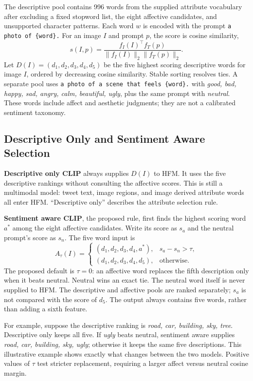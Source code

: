 \documentclass[conference]{IEEEtran}
\begin{document}
The descriptive pool contains 996 words from the supplied attribute vocabulary after excluding a fixed stopword list, the eight affective candidates, and unsupported character patterns. Each word $w$ is encoded with the prompt \texttt{a photo of \{word\}.} For an image $I$ and prompt $p$, the score is cosine similarity,
\begin{equation}
s(I,p)=\frac{f_I(I)^\top f_T(p)}{\lVert f_I(I)\rVert_2\lVert f_T(p)\rVert_2}.
\end{equation}
Let $D(I)=(d_1,d_2,d_3,d_4,d_5)$ be the five highest scoring descriptive words for image $I$, ordered by decreasing cosine similarity. Stable sorting resolves ties. A separate pool uses \texttt{a photo of a scene that feels \{word\}.} with \emph{good, bad, happy, sad, angry, calm, beautiful, ugly}, plus the same prompt with \emph{neutral}. These words include affect and aesthetic judgments; they are not a calibrated sentiment taxonomy.

\subsection{Descriptive Only and Sentiment Aware Selection}
\textbf{Descriptive only CLIP} always supplies $D(I)$ to HFM. It uses the five descriptive rankings without consulting the affective scores. This is still a multimodal model: tweet text, image regions, and image derived attribute words all enter HFM. ``Descriptive only'' describes the attribute selection rule.

\textbf{Sentiment aware CLIP}, the proposed rule, first finds the highest scoring word $a^*$ among the eight affective candidates. Write its score as $s_a$ and the neutral prompt's score as $s_n$. The five word input is
\begin{equation}
A_\tau(I)=
\begin{cases}
(d_1,d_2,d_3,d_4,a^*), & s_a-s_n>\tau,\\
(d_1,d_2,d_3,d_4,d_5), & \text{otherwise}.
\end{cases}
\end{equation}
The proposed default is $\tau=0$: an affective word replaces the fifth description only when it beats neutral. Neutral wins an exact tie. The neutral word itself is never supplied to HFM. The descriptive and affective pools are ranked separately; $s_a$ is not compared with the score of $d_5$. The output always contains five words, rather than adding a sixth feature.

For example, suppose the descriptive ranking is \emph{road, car, building, sky, tree}. Descriptive only keeps all five. If \emph{ugly} beats neutral, sentiment aware supplies \emph{road, car, building, sky, ugly}; otherwise it keeps the same five descriptions. This illustrative example shows exactly what changes between the two models. Positive values of $\tau$ test stricter replacement, requiring a larger affect versus neutral cosine margin.
\end{document}
